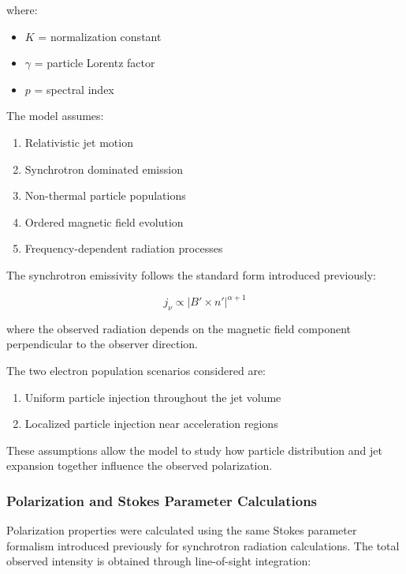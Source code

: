 \documentclass{article}
\begin{document}
where:

\begin{itemize}
\item $K$ = normalization constant
\item $\gamma$ = particle Lorentz factor
\item $p$ = spectral index
\end{itemize}

The model assumes:

\begin{enumerate}
\item Relativistic jet motion
\item Synchrotron dominated emission
\item Non-thermal particle populations
\item Ordered magnetic field evolution
\item Frequency-dependent radiation processes
\end{enumerate}

The synchrotron emissivity follows the standard form introduced previously:

\begin{equation}
j_\nu
\propto
|B' \times n'|^{\alpha+1}
\end{equation}

where the observed radiation depends on the magnetic field component perpendicular to the observer direction.

The two electron population scenarios considered are:

\begin{enumerate}
\item Uniform particle injection throughout the jet volume
\item Localized particle injection near acceleration regions
\end{enumerate}

These assumptions allow the model to study how particle distribution and jet expansion together influence the observed polarization.


\subsubsection{Polarization and Stokes Parameter Calculations}

Polarization properties were calculated using the same Stokes parameter formalism introduced previously for synchrotron radiation calculations. The total observed intensity is obtained through line-of-sight integration:
\end{document}
